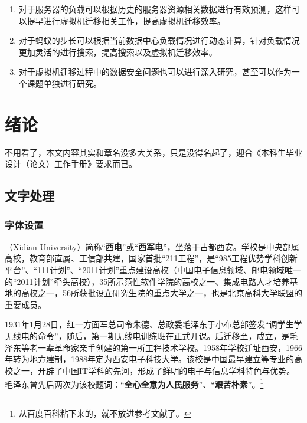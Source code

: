 \begin{enumerate}[(1)]
    \item 对于服务器的负载可以根据历史的服务器资源相关数据进行有效预测，这样可以提早进行虚拟机迁移相关工作，提高虚拟机迁移效率。
    \item 对于蚂蚁的步长可以根据当前数据中心负载情况进行动态计算，针对负载情况更加灵活的进行搜索，提高搜索以及虚拟机迁移效率。
    \item 对于虚拟机迁移过程中的数据安全问题也可以进行深入研究，甚至可以作为一个课题单独进行研究。
\end{enumerate}


























\chapter{绪论}
不用看了，本文内容其实和章名没多大关系，只是没得名起了，迎合《本科生毕业设计（论文）工作手册》要求而已。

\section{文字处理}

\subsection{字体设置}
\textbf{}（Xidian University）简称“\textbf{西电}”或“\textbf{西军电}”，坐落于古都西安。学校是中央部属高校，教育部直属、工信部共建，国家首批“{\heiti 211工程}”，是“{\fangsong 985工程优势学科创新平台}”、“111计划”、“2011计划”重点建设高校{\youyuan （中国电子信息领域、邮电领域唯一的“2011计划”牵头高校）}，35所示范性软件学院的高校之一、集成电路人才培养基地的高校之一，56所获批设立研究生院的重点大学之一，也是{\lishu 北京高科大学联盟}的重要成员。 

1931年1月28日，红一方面军{\yahei 总司令朱德、总政委毛泽东}于小布总部签发“调学生学无线电的命令”，随后，第一期无线电训练班在正式开课。后迁移至，成立，是毛泽东等老一辈革命家亲手创建的第一所工程技术学校。1958年学校迁址西安，1966年转为地方建制，1988年定为西安电子科技大学。该校是中国最早建立等专业的高校之一，开辟了中国IT学科的先河，形成了鲜明的电子与信息学科特色与优势。毛泽东曾先后两次为该校题词：“\textbf{\large 全心全意为人民服务}”、“\textbf{\large 艰苦朴素}”。\footnote{从百度百科粘下来的，就不放进参考文献了。}

